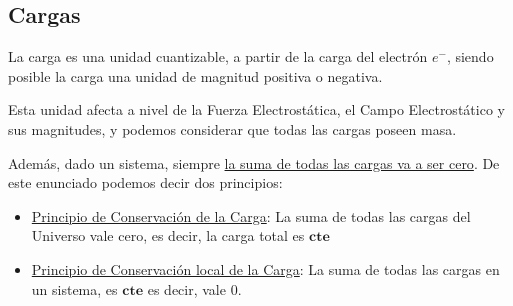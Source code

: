 \subsection{Cargas}
\noindent La carga es una unidad cuantizable, a partir de la carga del electrón \(e^{-}\),  siendo posible la carga una unidad de magnitud positiva o negativa. \par \noindent
Esta unidad afecta a nivel de la Fuerza Electrostática, el Campo Electrostático y sus magnitudes, y podemos considerar que todas las cargas poseen masa. \par \noindent
Además, dado un sistema, siempre \underline{la suma de todas las cargas va a ser cero}. De este enunciado podemos decir dos principios:
\begin{itemize}
        \item \underline{Principio de Conservación de la Carga}: La suma de todas las cargas del Universo vale cero, es decir, la carga total es \(\bm{cte}\)
        \item \underline{Principio de Conservación local de la Carga}: La suma de todas las cargas en un sistema, es \(\bm{cte}\) es decir, vale 0.
\end{itemize}
